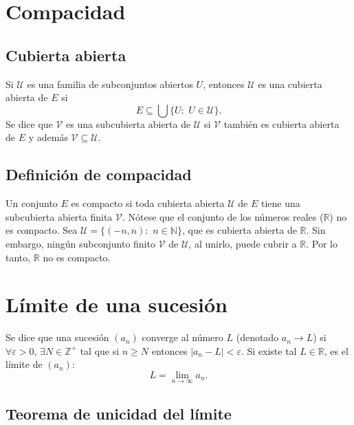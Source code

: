 \documentclass{article}
\begin{document}
\section*{Compacidad}

\subsection*{Cubierta abierta}
Si $\mathcal{U}$ es una familia de subconjuntos abiertos $U$, entonces $\mathcal{U}$ es una cubierta abierta de $E$ si 
$$E\subseteq\bigcup \bigg\{U: \hspace{4pt}U\in\mathcal{U}\bigg\}.$$
Se dice que $\mathcal{V}$ es una subcubierta abierta de $\mathcal{U}$ si $\mathcal{V}$ también es cubierta abierta de $E$ y además $\mathcal{V}\subseteq\mathcal{U}$.

\subsection*{Definición de compacidad}
Un conjunto $E$ es compacto si toda cubierta abierta $\mathcal{U}$ de $E$ tiene una subcubierta abierta finita $\mathcal{V}$. Nótese que el conjunto de los números reales ($\mathbb{R}$) no es compacto. Sea $\mathcal{U}=\{(-n,n):\hspace{4pt} n\in\mathbb{N}\}$, que es cubierta abierta de $\mathbb{R}$. Sin embargo, ningún subconjunto finito $\mathcal{V}$ de $\mathcal{U}$, al unirlo, puede cubrir a $\mathbb{R}$. Por lo tanto, $\mathbb{R}$ no es compacto.


\section*{Límite de una sucesión}

Se dice que una sucesión $(a_n)$ converge al número $L$ (denotado $a_n\to L$) si $\forall\varepsilon>0$, $\exists N\in\mathbb{Z}^{+}$ tal que si $n\geq N$ entonces $|a_n-L|<\varepsilon$. Si existe tal $L\in\mathbb{R}$, es el límite de $(a_n)$:
$$L=\lim_{n\to\infty} a_n.$$

\subsection*{Teorema de unicidad del límite}
\end{document}

